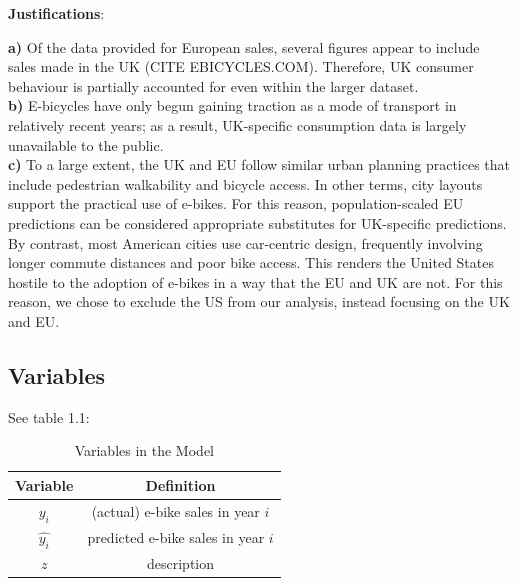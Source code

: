 \vspace{-6pt}
\noindent\textbf{Justifications}: \\
\vspace{-24pt}
\begin{adjustwidth}{24pt}{0pt}
    \noindent\textbf{a)} Of the data provided for European sales, several figures appear to include sales made in the UK (CITE EBICYCLES.COM). Therefore, UK consumer behaviour is partially accounted for even within the larger dataset. \\
    \noindent\textbf{b)} E-bicycles have only begun gaining traction as a mode of transport in relatively recent years; as a result, UK-specific consumption data is largely unavailable to the public. \\
    \noindent\textbf{c)} To a large extent, the UK and EU follow similar urban planning practices that include pedestrian walkability and bicycle access.
    In other terms, city layouts support the practical use of e-bikes.
    For this reason, population-scaled EU predictions can be considered appropriate substitutes for UK-specific predictions.
    By contrast, most American cities use car-centric design, frequently involving longer commute distances and poor bike access.
    This renders the United States hostile to the adoption of e-bikes in a way that the EU and UK are not.
    For this reason, we chose to exclude the US from our analysis, instead focusing on the UK and EU.
\end{adjustwidth}

%

\subsection{Variables}
See table 1.1:
\begin{table}[h!]
    \centering
    \begin{tabular}{cc}
        \toprule
        Variable & Definition      \\
        \midrule
        $y_i$      & (actual) e-bike sales in year $i$     \\
        $\hat{y_i}$      & predicted e-bike sales in year $i$     \\
        $z$      & description     \\
        \bottomrule
    \end{tabular}
    \caption{Variables in the Model}
    \label{tab:q1_vars}
\end{table}

